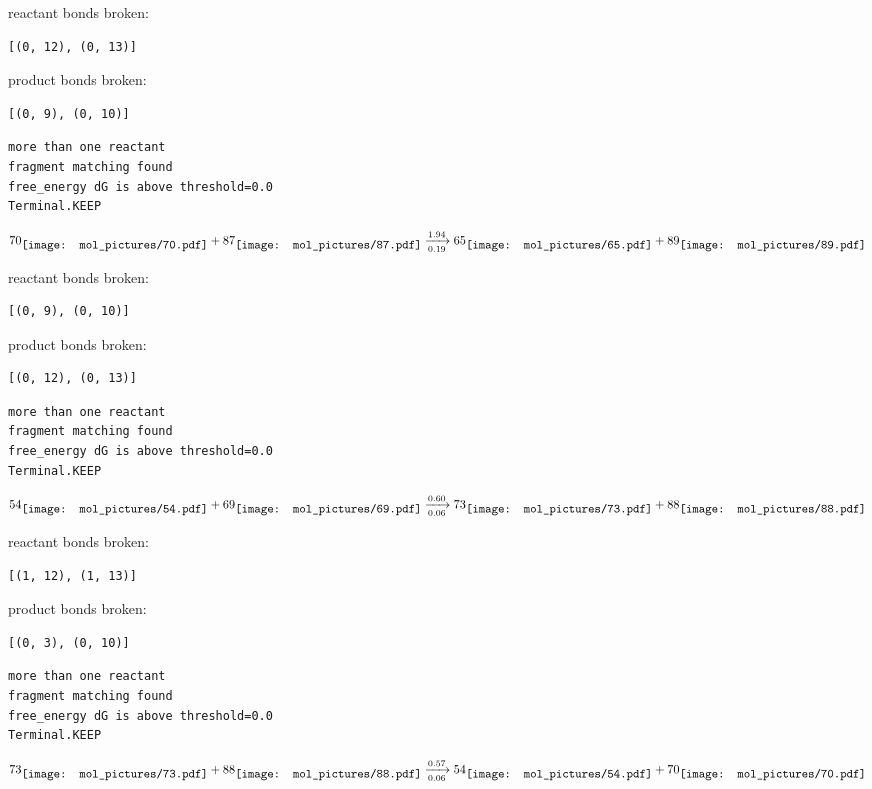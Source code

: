 \documentclass{article}
\begin{document}
reactant bonds broken:\begin{verbatim}
[(0, 12), (0, 13)]
\end{verbatim}
product bonds broken:\begin{verbatim}
[(0, 9), (0, 10)]
\end{verbatim}




\vspace{1cm}
\begin{verbatim}
more than one reactant
fragment matching found
free_energy dG is above threshold=0.0
Terminal.KEEP
\end{verbatim}
$$
70
\raisebox{-.5\height}{\texttt{[image: mol\_pictures/70.pdf]}}
+
87
\raisebox{-.5\height}{\texttt{[image: mol\_pictures/87.pdf]}}
\xrightarrow[0.19]{1.94}
65
\raisebox{-.5\height}{\texttt{[image: mol\_pictures/65.pdf]}}
+
89
\raisebox{-.5\height}{\texttt{[image: mol\_pictures/89.pdf]}}
$$


reactant bonds broken:\begin{verbatim}
[(0, 9), (0, 10)]
\end{verbatim}
product bonds broken:\begin{verbatim}
[(0, 12), (0, 13)]
\end{verbatim}




\vspace{1cm}
\begin{verbatim}
more than one reactant
fragment matching found
free_energy dG is above threshold=0.0
Terminal.KEEP
\end{verbatim}
$$
54
\raisebox{-.5\height}{\texttt{[image: mol\_pictures/54.pdf]}}
+
69
\raisebox{-.5\height}{\texttt{[image: mol\_pictures/69.pdf]}}
\xrightarrow[0.06]{0.60}
73
\raisebox{-.5\height}{\texttt{[image: mol\_pictures/73.pdf]}}
+
88
\raisebox{-.5\height}{\texttt{[image: mol\_pictures/88.pdf]}}
$$


reactant bonds broken:\begin{verbatim}
[(1, 12), (1, 13)]
\end{verbatim}
product bonds broken:\begin{verbatim}
[(0, 3), (0, 10)]
\end{verbatim}




\vspace{1cm}
\begin{verbatim}
more than one reactant
fragment matching found
free_energy dG is above threshold=0.0
Terminal.KEEP
\end{verbatim}
$$
73
\raisebox{-.5\height}{\texttt{[image: mol\_pictures/73.pdf]}}
+
88
\raisebox{-.5\height}{\texttt{[image: mol\_pictures/88.pdf]}}
\xrightarrow[0.06]{0.57}
54
\raisebox{-.5\height}{\texttt{[image: mol\_pictures/54.pdf]}}
+
70
\raisebox{-.5\height}{\texttt{[image: mol\_pictures/70.pdf]}}
$$
\end{document}
